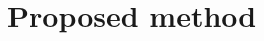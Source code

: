 \documentclass{article}
\begin{document}
    \section{Proposed method}\label{sec:proposed-method}


%
%
%
%
%
%
%
%
%
%
\end{document}
